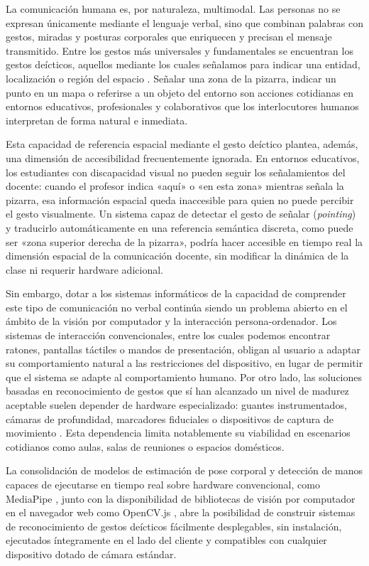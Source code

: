 \documentclass[12pt]{report} %
\begin{document}
La comunicación humana es, por naturaleza, multimodal. Las personas no se expresan únicamente mediante el lenguaje verbal, sino que combinan palabras con gestos, miradas y posturas corporales que enriquecen y precisan el mensaje transmitido. Entre los gestos más universales y fundamentales se encuentran los gestos deícticos, aquellos mediante los cuales señalamos para indicar una entidad, localización o región del espacio \citep{mcneill1992}. Señalar una zona de la pizarra, indicar un punto en un mapa o referirse a un objeto del entorno son acciones cotidianas en entornos educativos, profesionales y colaborativos que los interlocutores humanos interpretan de forma natural e inmediata.

Esta capacidad de referencia espacial mediante el gesto deíctico plantea, además, una dimensión de accesibilidad frecuentemente ignorada. En entornos educativos, los estudiantes con discapacidad visual no pueden seguir los señalamientos del docente: cuando el profesor indica «aquí» o «en esta zona» mientras señala la pizarra, esa información espacial queda inaccesible para quien no puede percibir el gesto visualmente. Un sistema capaz de detectar el gesto de señalar (\textit{pointing}) y traducirlo automáticamente en una referencia semántica discreta, como puede ser «zona superior derecha de la pizarra», podría hacer accesible en tiempo real la dimensión espacial de la comunicación docente, sin modificar la dinámica de la clase ni requerir hardware adicional.

Sin embargo, dotar a los sistemas informáticos de la capacidad de comprender este tipo de comunicación no verbal continúa siendo un problema abierto en el ámbito de la visión por computador y la interacción persona-ordenador. Los sistemas de interacción convencionales, entre los cuales podemos encontrar ratones, pantallas táctiles o mandos de presentación, obligan al usuario a adaptar su comportamiento natural a las restricciones del dispositivo, en lugar de permitir que el sistema se adapte al comportamiento humano. Por otro lado, las soluciones basadas en reconocimiento de gestos que sí han alcanzado un nivel de madurez aceptable suelen depender de hardware especializado: guantes instrumentados, cámaras de profundidad, marcadores fiduciales o dispositivos de captura de movimiento \citep{suarez2012hand}. Esta dependencia limita notablemente su viabilidad en escenarios cotidianos como aulas, salas de reuniones o espacios domésticos.

La consolidación de modelos de estimación de pose corporal y detección de manos capaces de ejecutarse en tiempo real sobre hardware convencional, como MediaPipe \citep{lugaresi2019mediapipe, bazarevsky2020blazepose, zhang2020mediapipe}, junto con la disponibilidad de bibliotecas de visión por computador en el navegador web como OpenCV.js \citep{bradski2000opencv}, abre la posibilidad de construir sistemas de reconocimiento de gestos deícticos fácilmente desplegables, sin instalación, ejecutados íntegramente en el lado del cliente y compatibles con cualquier dispositivo dotado de cámara estándar.
\end{document}
